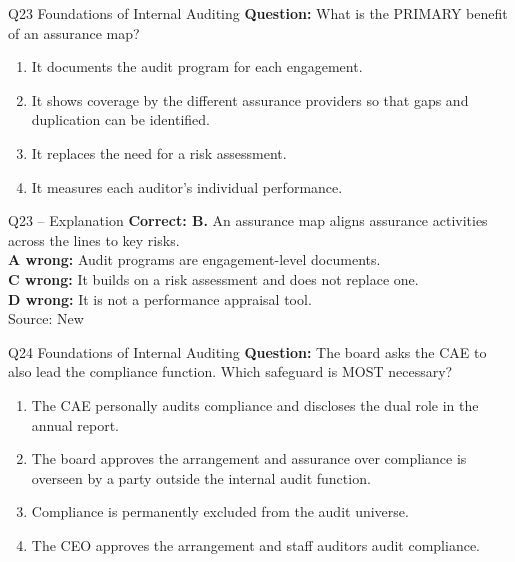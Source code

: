 \documentclass[aspectratio=169,10pt]{beamer}
\begin{document}
\begin{frame}[t]{Q23 \hfill {\scriptsize Foundations of Internal Auditing}}
	\small
	\textbf{Question:} What is the PRIMARY benefit of an assurance map?
	\begin{enumerate}[label=\Alph*.,itemsep=1pt,topsep=3pt]
			\item It documents the audit program for each engagement.
			\item It shows coverage by the different assurance providers so that gaps and duplication can be identified.
			\item It replaces the need for a risk assessment.
			\item It measures each auditor's individual performance.
	\end{enumerate}
\end{frame}

\begin{frame}[t]{Q23 -- Explanation}
	\footnotesize
	\textbf{Correct: B.} An assurance map aligns assurance activities across the lines to key risks. \\[5pt]
\textbf{A wrong:} Audit programs are engagement-level documents. \\[3pt]
\textbf{C wrong:} It builds on a risk assessment and does not replace one. \\[3pt]
\textbf{D wrong:} It is not a performance appraisal tool. \\[3pt]
	\vfill {\tiny Source: New}
\end{frame}

\begin{frame}[t]{Q24 \hfill {\scriptsize Foundations of Internal Auditing}}
	\small
	\textbf{Question:} The board asks the CAE to also lead the compliance function. Which safeguard is MOST necessary?
	\begin{enumerate}[label=\Alph*.,itemsep=1pt,topsep=3pt]
			\item The CAE personally audits compliance and discloses the dual role in the annual report.
			\item The board approves the arrangement and assurance over compliance is overseen by a party outside the internal audit function.
			\item Compliance is permanently excluded from the audit universe.
			\item The CEO approves the arrangement and staff auditors audit compliance.
	\end{enumerate}
\end{frame}
\end{document}
